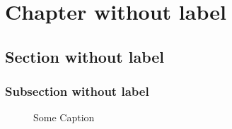 \documentclass{article}
\begin{document}
    \chapter{Chapter without label}\label{ch:chapter-without-label}


    \section{Section without label}\label{sec:section-without-label}

    \subsection{Subsection without label}\label{subsec:subsection-without-label}
    \begin{figure}
        \caption{Some Caption}\label{fig:figure}
    \end{figure}
    \begin{figure}
        \label{fig:figure2}

    \end{figure}
\end{document}
